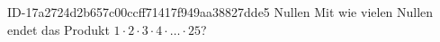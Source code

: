 \begin{exercise}
      {ID-17a2724d2b657c00ccff71417f949aa38827dde5}
      {Nullen}
  \ifproblem\problem
    Mit wie vielen Nullen endet das Produkt $1\cdot2\cdot3\cdot4\cdot\ldots\cdot25$?
  \fi
\end{exercise}
